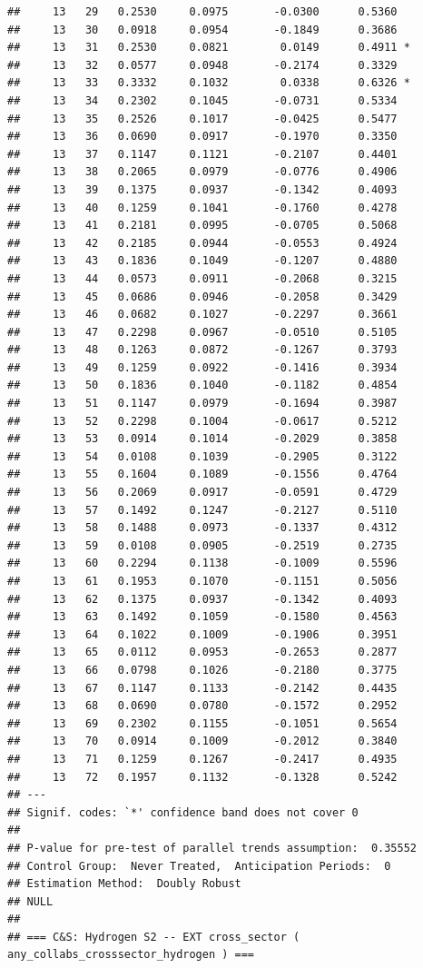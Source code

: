 \documentclass[
]{article}
\begin{document}
\begin{verbatim}
##     13   29   0.2530     0.0975       -0.0300      0.5360  
##     13   30   0.0918     0.0954       -0.1849      0.3686  
##     13   31   0.2530     0.0821        0.0149      0.4911 *
##     13   32   0.0577     0.0948       -0.2174      0.3329  
##     13   33   0.3332     0.1032        0.0338      0.6326 *
##     13   34   0.2302     0.1045       -0.0731      0.5334  
##     13   35   0.2526     0.1017       -0.0425      0.5477  
##     13   36   0.0690     0.0917       -0.1970      0.3350  
##     13   37   0.1147     0.1121       -0.2107      0.4401  
##     13   38   0.2065     0.0979       -0.0776      0.4906  
##     13   39   0.1375     0.0937       -0.1342      0.4093  
##     13   40   0.1259     0.1041       -0.1760      0.4278  
##     13   41   0.2181     0.0995       -0.0705      0.5068  
##     13   42   0.2185     0.0944       -0.0553      0.4924  
##     13   43   0.1836     0.1049       -0.1207      0.4880  
##     13   44   0.0573     0.0911       -0.2068      0.3215  
##     13   45   0.0686     0.0946       -0.2058      0.3429  
##     13   46   0.0682     0.1027       -0.2297      0.3661  
##     13   47   0.2298     0.0967       -0.0510      0.5105  
##     13   48   0.1263     0.0872       -0.1267      0.3793  
##     13   49   0.1259     0.0922       -0.1416      0.3934  
##     13   50   0.1836     0.1040       -0.1182      0.4854  
##     13   51   0.1147     0.0979       -0.1694      0.3987  
##     13   52   0.2298     0.1004       -0.0617      0.5212  
##     13   53   0.0914     0.1014       -0.2029      0.3858  
##     13   54   0.0108     0.1039       -0.2905      0.3122  
##     13   55   0.1604     0.1089       -0.1556      0.4764  
##     13   56   0.2069     0.0917       -0.0591      0.4729  
##     13   57   0.1492     0.1247       -0.2127      0.5110  
##     13   58   0.1488     0.0973       -0.1337      0.4312  
##     13   59   0.0108     0.0905       -0.2519      0.2735  
##     13   60   0.2294     0.1138       -0.1009      0.5596  
##     13   61   0.1953     0.1070       -0.1151      0.5056  
##     13   62   0.1375     0.0937       -0.1342      0.4093  
##     13   63   0.1492     0.1059       -0.1580      0.4563  
##     13   64   0.1022     0.1009       -0.1906      0.3951  
##     13   65   0.0112     0.0953       -0.2653      0.2877  
##     13   66   0.0798     0.1026       -0.2180      0.3775  
##     13   67   0.1147     0.1133       -0.2142      0.4435  
##     13   68   0.0690     0.0780       -0.1572      0.2952  
##     13   69   0.2302     0.1155       -0.1051      0.5654  
##     13   70   0.0914     0.1009       -0.2012      0.3840  
##     13   71   0.1259     0.1267       -0.2417      0.4935  
##     13   72   0.1957     0.1132       -0.1328      0.5242  
## ---
## Signif. codes: `*' confidence band does not cover 0
## 
## P-value for pre-test of parallel trends assumption:  0.35552
## Control Group:  Never Treated,  Anticipation Periods:  0
## Estimation Method:  Doubly Robust
## NULL
## 
## === C&S: Hydrogen S2 -- EXT cross_sector ( any_collabs_crosssector_hydrogen ) ===
\end{verbatim}
\end{document}
